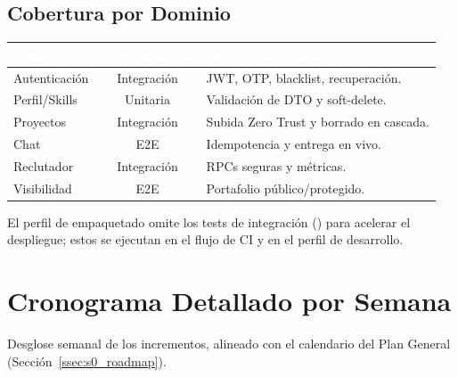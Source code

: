 \section{Cobertura por Dominio}
\label{sec:anexo_pruebas_cobertura}
\renewcommand{\arraystretch}{1.3}
\fontsize{9}{10.8}\selectfont\sffamily
\noindent
\begin{tabularx}{\textwidth}{|l|c|X|}
\hline
\rowcolor{colorPrimario}
\textcolor{white}{\textbf{Dominio}} & \textcolor{white}{\textbf{Nivel principal}} & \textcolor{white}{\textbf{Foco de la verificación}} \\ \hline
Autenticación & Integración & JWT, OTP, blacklist, recuperación. \\ \hline
\rowcolor{grisTecnico}
Perfil/Skills & Unitaria & Validación de DTO y soft-delete. \\ \hline
Proyectos & Integración & Subida Zero Trust y borrado en cascada. \\ \hline
\rowcolor{grisTecnico}
Chat & E2E & Idempotencia y entrega en vivo. \\ \hline
Reclutador & Integración & RPCs seguras y métricas. \\ \hline
\rowcolor{grisTecnico}
Visibilidad & E2E & Portafolio público/protegido. \\ \hline
\end{tabularx}\normalfont\normalsize

\begin{NotaTecnica}
El perfil de empaquetado  omite los tests de integración () para
acelerar el despliegue; estos se ejecutan en el flujo de CI y en el perfil de desarrollo.
\end{NotaTecnica}

\clearpage

\chapter{Cronograma Detallado por Semana}
\label{cap:anexo_cronograma}

Desglose semanal de los incrementos, alineado con el calendario del Plan General
(Sección~\ref{ssec:s0_roadmap}).\par

